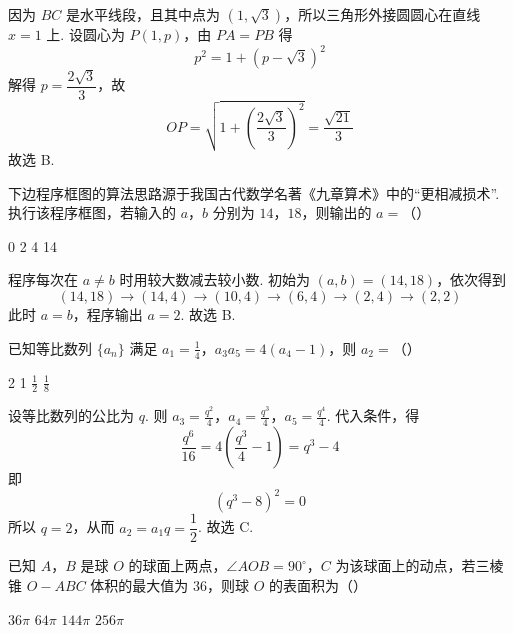 
\begin{solution}
因为 \(BC\) 是水平线段，且其中点为 \((1,\sqrt{3})\)，所以三角形外接圆圆心在直线 \(x=1\) 上. 设圆心为 \(P(1,p)\)，由 \(PA=PB\) 得
\[
p^{2}=1+(p-\sqrt{3})^{2}
\]
解得 \(p=\dfrac{2\sqrt{3}}{3}\)，故
\[
OP=\sqrt{1+\left(\frac{2\sqrt{3}}{3}\right)^{2}}=\frac{\sqrt{21}}{3}
\]
故选 B.
\end{solution}

\begin{problem}
下边程序框图的算法思路源于我国古代数学名著《九章算术》中的“更相减损术”. 执行该程序框图，若输入的 \(a\)，\(b\) 分别为 \(14\)，\(18\)，则输出的 \(a =\)（\quad）


\choices
    {0}
    {2}
    {4}
    {14}
\end{problem}


\begin{solution}
程序每次在 \(a\ne b\) 时用较大数减去较小数. 初始为 \((a,b)=(14,18)\)，依次得到
\[
(14,18)\to(14,4)\to(10,4)\to(6,4)\to(2,4)\to(2,2)
\]
此时 \(a=b\)，程序输出 \(a=2\). 故选 B.
\end{solution}

\begin{problem}
已知等比数列 \(\{a_{n}\}\) 满足 \(a_{1} = \frac{1}{4}\)，\(a_{3}a_{5} = 4(a_{4} - 1)\)，则 \(a_{2} =\)（\quad）

\choices
    {2}
    {1}
    {\(\frac{1}{2}\)}
    {\(\frac{1}{8}\)}
\end{problem}


\begin{solution}
设等比数列的公比为 \(q\). 则
\(a_{3}=\frac{q^{2}}{4}\)，\(a_{4}=\frac{q^{3}}{4}\)，\(a_{5}=\frac{q^{4}}{4}\).
代入条件，得
\[
\frac{q^{6}}{16}=4\left(\frac{q^{3}}{4}-1\right)=q^{3}-4
\]
即
\[
(q^{3}-8)^{2}=0
\]
所以 \(q=2\)，从而 \(a_{2}=a_{1}q=\dfrac12\). 故选 C.
\end{solution}

\begin{problem}
已知 \(A\)，\(B\) 是球 \(O\) 的球面上两点，\(\angle AOB = 90^{\circ}\)，\(C\) 为该球面上的动点，若三棱锥 \(O-ABC\) 体积的最大值为 \(36\)，则球 \(O\) 的表面积为（\quad）

\choices
    {\(36\pi\)}
    {\(64\pi\)}
    {\(144\pi\)}
    {\(256\pi\)}
\end{problem}

